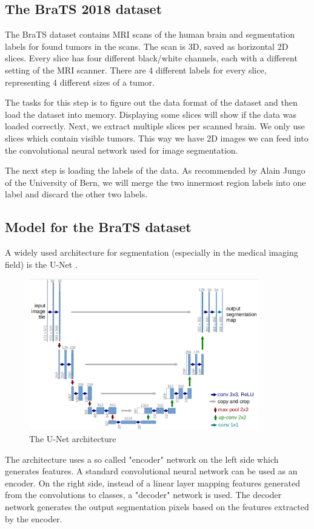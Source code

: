 \subsection{The BraTS 2018 dataset}
The BraTS \cite{menze2015multimodal} dataset contains MRI scans of the human brain and segmentation labels for found tumors in the scans.
The scan is 3D, saved as horizontal 2D slices. Every slice has four different black/white channels, each with a different setting of the MRI scanner.
There are 4 different labels for every slice, representing 4 different sizes of a tumor.

The tasks for this step is to figure out the data format of the dataset and then load the dataset into memory. Displaying some slices will show if the data was loaded correctly. Next, we extract multiple slices per scanned brain. We only use slices which contain visible tumors. This way we have 2D images we can feed into the convolutional neural network used for image segmentation.

The next step is loading the labels of the data. As recommended by Alain Jungo of the University of Bern, we will merge the two innermost region labels into one label and discard the other two labels.

\subsection{Model for the BraTS dataset}
A widely used architecture for segmentation (especially in the medical imaging field) is the U-Net \cite{ronneberger2015u}.

\begin{figure}[H]
\centering
\caption{The U-Net architecture}
\includegraphics[width=10cm]{images/unet.png}
\end{figure}

The architecture uses a so called "encoder" network on the left side which generates features. A standard convolutional neural network can be used as an encoder. On the right side, instead of a linear layer mapping features generated from the convolutions to classes, a "decoder" network is used. The decoder network generates the output segmentation pixels based on the features extracted by the encoder.

